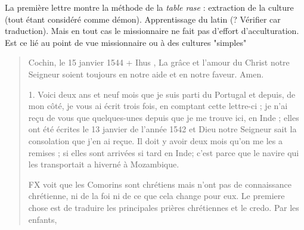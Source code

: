 \begin{Synthesis}
La première lettre montre la méthode de la \textit{table rase} : extraction de la culture (tout étant considéré comme démon). Apprentissage du latin (? Vérifier car traduction). Mais en tout cas le missionnaire ne fait pas d'effort d'acculturation.
Est ce lié au point de vue missionnaire ou à des cultures "simples"
\end{Synthesis}

\begin{quote}
Cochin, le 15 janvier 1544
+
Ihus ,
La grâce et l'amour du Christ notre Seigneur soient toujours en
notre aide et en notre faveur. Amen.


1. Voici deux ans et neuf mois que je suis parti du Portugal et
depuis, de mon côté, je vous ai écrit trois fois, en comptant cette
lettre-ci ; je n'ai reçu de vous que quelques-unes depuis que je me
trouve ici, en Inde ; elles ont été écrites le 13 janvier de l'année
1542 et Dieu notre Seigneur sait la consolation que j'en ai reçue.
Il doit y avoir deux mois qu'on me les a remises ; si elles sont arrivées
si tard en Inde; c'est parce que le navire qui les transportait
a hiverné à Mozambique.
\begin{Synthesis}
 FX voit que les Comorins sont chrétiens mais n'ont pas de connaissance chrétienne, ni de la foi ni de ce que cela change pour eux. Le premiere chose est de traduire les principales prières chrétiennes et le credo.  
 Par les enfants,
\end{Synthesis}


\end{quote}
